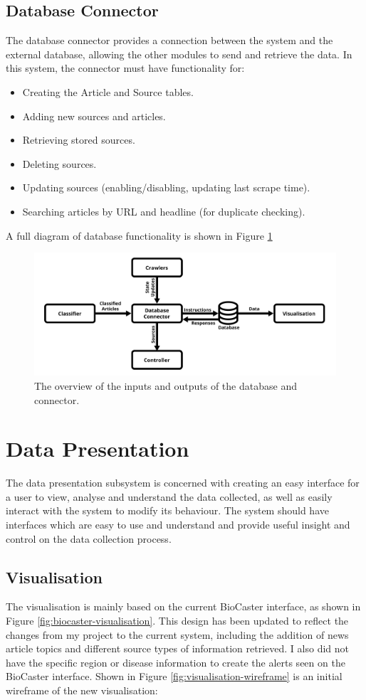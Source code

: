 \documentclass{l4proj}
\begin{document}
\subsection{Database Connector}
The database connector provides a connection between the system and the external database, allowing the other modules to send and retrieve the data. In this system, the connector must have functionality for:
\begin{itemize}
    \item Creating the Article and Source tables.
    \item Adding new sources and articles.
    \item Retrieving stored sources.
    \item Deleting sources.
    \item Updating sources (enabling/disabling, updating last scrape time).
    \item Searching articles by URL and headline (for duplicate checking). 
\end{itemize}
A full diagram of database functionality is shown in Figure \ref{fig:database_diagram}
 \begin{figure}[h]
\centering
\includegraphics[width=\textwidth]{images/Database-diagram.png}
\caption{The overview of the inputs and outputs of the database and connector.}
\label{fig:database_diagram}
\end{figure}
\section{Data Presentation}
The data presentation subsystem is concerned with creating an easy interface for a user to view, analyse and understand the data collected, as well as easily interact with the system to modify its behaviour. The system should have interfaces which are easy to use and understand and provide useful insight and control on the data collection process.

\subsection{Visualisation}
The visualisation is mainly based on the current BioCaster interface, as shown in Figure \ref{fig:biocaster-visualisation}. This design has been updated to reflect the changes from my project to the current system, including the addition of news article topics and different source types of information retrieved. I also did not have the specific region or disease information to create the alerts seen on the BioCaster interface. Shown in Figure \ref{fig:visualisation-wireframe} is an initial wireframe of the new visualisation: \par
\end{document}
